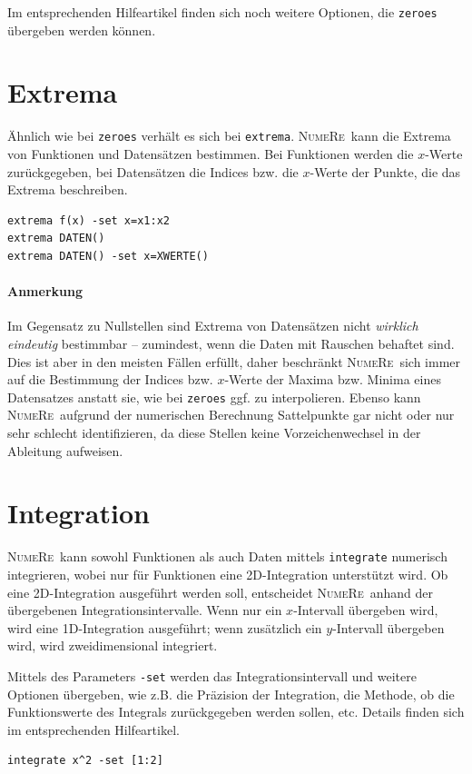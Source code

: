 \documentclass[DIV=14,headsepline,footsepline]{scrbook}
\newcommand{\NR}{\textsc{Nu\-me\-Re}}
\begin{document}
				Im entsprechenden Hilfeartikel finden sich noch weitere Optionen, die \verb+zeroes+ übergeben werden können.
				
			\section{Extrema}
				Ähnlich wie bei \verb+zeroes+ verhält es sich bei \verb+extrema+. \NR\ kann die Extrema von Funktionen und Datensätzen bestimmen. Bei Funktionen werden die $x$-Werte zurückgegeben, bei Datensätzen die Indices bzw. die $x$-Werte der Punkte, die das Extrema beschreiben.
				\begin{lstlisting}
extrema f(x) -set x=x1:x2
extrema DATEN()
extrema DATEN() -set x=XWERTE()
				\end{lstlisting}
				\paragraph{Anmerkung}Im Gegensatz zu Nullstellen sind Extrema von Datensätzen nicht \emph{wirklich eindeutig} bestimmbar -- zumindest, wenn die Daten mit Rauschen behaftet sind. Dies ist aber in den meisten Fällen erfüllt, daher beschränkt \NR\ sich immer auf die Bestimmung der Indices bzw. $x$-Werte der Maxima bzw. Minima eines Datensatzes anstatt sie, wie bei \verb+zeroes+ ggf. zu interpolieren. Ebenso kann \NR\ aufgrund der numerischen Berechnung Sattelpunkte gar nicht oder nur sehr schlecht identifizieren, da diese Stellen keine Vorzeichenwechsel in der Ableitung aufweisen.
				
			\section{Integration}
				\NR\ kann sowohl Funktionen als auch Daten mittels \verb+integrate+ numerisch integrieren, wobei nur für Funktionen eine 2D-Integration unterstützt wird. Ob eine 2D-Integration ausgeführt werden soll, entscheidet \NR\ anhand der übergebenen Integrationsintervalle. Wenn nur ein $x$-Intervall übergeben wird, wird eine 1D-Integration ausgeführt; wenn zusätzlich ein $y$-Intervall übergeben wird, wird zweidimensional integriert.
				
				Mittels des Parameters \verb+-set+ werden das Integrationsintervall und weitere Optionen übergeben, wie z.B. die Präzision der Integration, die Methode, ob die Funktionswerte des Integrals zurückgegeben werden sollen, etc. Details finden sich im entsprechenden Hilfeartikel.
				\begin{lstlisting}
integrate x^2 -set [1:2]
				\end{lstlisting}
				
\end{document}
